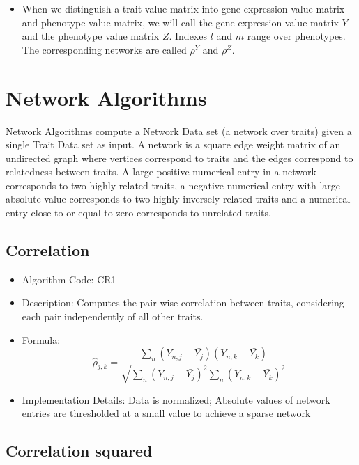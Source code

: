 \documentclass{article}
\begin{document}
\begin{itemize}
\item When we distinguish a trait value matrix into gene expression value matrix and phenotype value matrix, we will call the gene expression value matrix $Y$ and the phenotype value matrix $Z$. Indexes $l$ and $m$ range over phenotypes. The corresponding networks are called $\rho^Y$ and $\rho^Z$.
\end{itemize}


\section{Network Algorithms}

Network Algorithms compute a Network Data set (a network over traits) given a single Trait Data set as input. A network is a square edge weight matrix of an undirected graph where vertices correspond to traits and the edges correspond to relatedness between traits. A large positive numerical entry in a network corresponds to two highly related traits, a negative numerical entry with large absolute value corresponds to two highly inversely related traits and a numerical entry close to or equal to zero corresponds to unrelated traits.

\subsection{Correlation}

\begin{itemize}
\item Algorithm Code: CR1
\item Description: Computes the pair-wise correlation between traits, considering each pair independently of all other traits.
\item Formula:
\begin{equation*}
\hat{\rho}_{j,k} = \frac{\sum_n (Y_{n,j} - \bar{Y_j})(Y_{n,k} - \bar{Y_k})}{\sqrt{\sum_n (Y_{n,j} - \bar{Y_j})^2 \sum_n (Y_{n,k} - \bar{Y_k})^2}}
\end{equation*}
\item Implementation Details: Data is normalized; Absolute values of network entries are thresholded at a small value to achieve a sparse network 
\end{itemize}

\subsection{Correlation squared}
\end{document}
